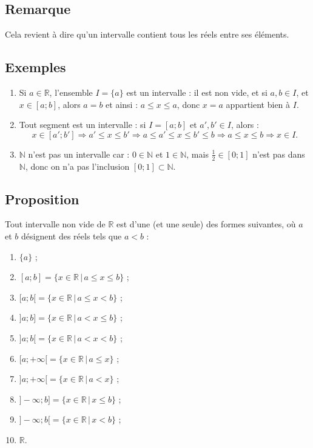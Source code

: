 \documentclass{article}
\begin{document}
	\subsection{Remarque }
	Cela revient à dire qu'un intervalle contient tous les réels entre ses éléments.
	
	\subsection{Exemples }
	\begin{enumerate}
		\item Si $a \in \mathbb{R}$, l'ensemble $I = \{a\}$ est un intervalle : il est non vide, et si $a, b \in I$, et $x \in [a; b]$, alors $a = b$ et ainsi : $a \leq x \leq a$, donc $x = a$ appartient bien à $I$.
		\item Tout segment est un intervalle : si $I = [a; b]$ et $a', b' \in I$, alors :
		\[ x \in [a'; b'] \Rightarrow a' \leq x \leq b' \Rightarrow a \leq a' \leq x \leq b' \leq b \Rightarrow a \leq x \leq b \Rightarrow x \in I. \]
		\item $\mathbb{N}$ n'est pas un intervalle car : $0 \in \mathbb{N}$ et $1 \in \mathbb{N}$, mais $\frac{1}{2} \in [0; 1]$ n'est pas dans $\mathbb{N}$, donc on n'a pas l'inclusion $[0; 1] \subset \mathbb{N}$.
	\end{enumerate}
	
	\subsection{Proposition}
	Tout intervalle non vide de $\mathbb{R}$ est d'une (et une seule) des formes suivantes, où $a$ et $b$ désignent des réels tels que $a < b$ :
	\begin{enumerate}
		\item $\{a\}$ ;
		\item $[a; b] = \{x \in \mathbb{R} \,|\, a \leq x \leq b\}$ ;
		\item $[a; b[ = \{x \in \mathbb{R} \,|\, a \leq x < b\}$ ;
		\item $]a; b] = \{x \in \mathbb{R} \,|\, a < x \leq b\}$ ;
		\item $]a; b[ = \{x \in \mathbb{R} \,|\, a < x < b\}$ ;
		\item $[a;+\infty[ = \{x \in \mathbb{R} \,|\, a \leq x\}$ ;
		\item $]a;+\infty[ = \{x \in \mathbb{R} \,|\, a < x\}$ ;
		\item $]-\infty; b] = \{x \in \mathbb{R} \,|\, x \leq b\}$ ;
		\item $]-\infty; b[ = \{x \in \mathbb{R} \,|\, x < b\}$ ;
		\item $\mathbb{R}$.
	\end{enumerate}
	
\end{document}
